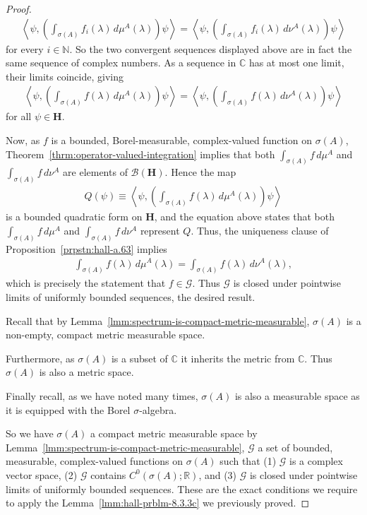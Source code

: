 \begin{proof}
\begin{align}
    \left< \psi, \left( \int_{\sigma(A)} f_i(\lambda) \, d\mu^A(\lambda) \right) \psi \right> = \left< \psi, \left( \int_{\sigma(A)} f_i(\lambda) \, d\nu^A(\lambda) \right) \psi \right>
\end{align}
for every $i \in \mathbb{N}$. So the two convergent sequences displayed above are in fact the same sequence of complex numbers. As a sequence in $\mathbb{C}$ has at most one limit, their limits coincide, giving
\begin{align}
    \left< \psi, \left( \int_{\sigma(A)} f(\lambda) \, d\mu^A(\lambda) \right) \psi \right> = \left< \psi, \left( \int_{\sigma(A)} f(\lambda) \, d\nu^A(\lambda) \right) \psi \right>
\end{align}
for all $\psi \in \mathbf{H}$.

Now, as $f$ is a bounded, Borel-measurable, complex-valued function on $\sigma(A)$, Theorem~\ref{thrm:operator-valued-integration} implies that both $\int_{\sigma(A)} f \, d\mu^A$ and $\int_{\sigma(A)} f \, d\nu^A$ are elements of $\mathcal{B}(\mathbf{H})$. Hence the map
\begin{align}
    Q(\psi) \equiv \left< \psi, \left( \int_{\sigma(A)} f(\lambda) \, d\mu^A(\lambda) \right) \psi \right>
\end{align}
is a bounded quadratic form on $\mathbf{H}$, and the equation above states that both $\int_{\sigma(A)} f \, d\mu^A$ and $\int_{\sigma(A)} f \, d\nu^A$ represent $Q$. Thus, the uniqueness clause of Proposition~\ref{prpstn:hall-a.63} implies
\begin{align}
    \int_{\sigma(A)} f(\lambda) \, d\mu^A(\lambda) = \int_{\sigma(A)} f(\lambda) \, d\nu^A(\lambda),
\end{align}
which is precisely the statement that $f \in \mathcal{G}$. Thus $\mathcal{G}$ is closed under pointwise limits of uniformly bounded sequences, the desired result.

Recall that by Lemma~\ref{lmm:spectrum-is-compact-metric-measurable}, $\sigma(A)$ is a non-empty, compact metric measurable space.

Furthermore, as $\sigma(A)$ is a subset of $\mathbb{C}$ it inherits the metric from $\mathbb{C}$. Thus $\sigma(A)$ is also a metric space.

Finally recall, as we have noted many times, $\sigma(A)$ is also a measurable space as it is equipped with the Borel $\sigma$-algebra.

So we have $\sigma(A)$ a compact metric measurable space by Lemma~\ref{lmm:spectrum-is-compact-metric-measurable}, $\mathcal{G}$ a set of bounded, measurable, complex-valued functions on $\sigma(A)$ such that (1) $\mathcal{G}$ is a complex vector space, (2) $\mathcal{G}$ contains $C^0(\sigma(A); \mathbb{R})$, and (3) $\mathcal{G}$ is closed under pointwise limits of uniformly bounded sequences. These are the exact conditions we require to apply the Lemma~\ref{lmm:hall-prblm-8.3.3c} we previously proved.


\end{proof}
